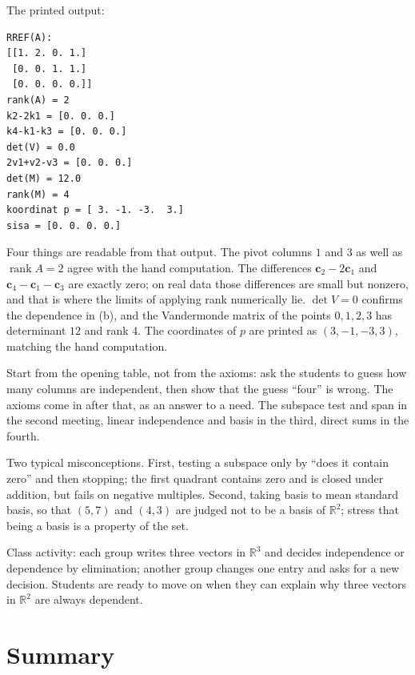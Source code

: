 The printed output:
\begin{verbatim}
RREF(A):
[[1. 2. 0. 1.]
 [0. 0. 1. 1.]
 [0. 0. 0. 0.]]
rank(A) = 2
k2-2k1 = [0. 0. 0.]
k4-k1-k3 = [0. 0. 0.]
det(V) = 0.0
2v1+v2-v3 = [0. 0. 0.]
det(M) = 12.0
rank(M) = 4
koordinat p = [ 3. -1. -3.  3.]
sisa = [0. 0. 0. 0.]
\end{verbatim}

Four things are readable from that output. The pivot columns $1$ and $3$ as well as
$\operatorname{rank}A=2$ agree with the hand computation. The differences
$\mathbf{c}_{2}-2\mathbf{c}_{1}$ and $\mathbf{c}_{4}-\mathbf{c}_{1}-\mathbf{c}_{3}$ are exactly
zero; on real data those differences are small but nonzero, and that is where the limits of
applying rank numerically lie. $\det V=0$ confirms the dependence in (b), and the Vandermonde
matrix of the points $0,1,2,3$ has determinant $12$ and rank $4$. The coordinates of $p$ are
printed as $(3,-1,-3,3)$, matching the hand computation.

\begin{untukdosen}
Start from the opening table, not from the axioms: ask the students to guess how many columns are
independent, then show that the guess ``four'' is wrong. The axioms come in after that, as an
answer to a need. The subspace test and span in the second meeting, linear independence and basis
in the third, direct sums in the fourth.

Two typical misconceptions. First, testing a subspace only by ``does it contain zero'' and then
stopping; the first quadrant contains zero and is closed under addition, but fails on negative
multiples. Second, taking basis to mean standard basis, so that $(5,7)$ and $(4,3)$ are judged not
to be a basis of $\mathbb{R}^{2}$; stress that being a basis is a property of the set.

Class activity: each group writes three vectors in $\mathbb{R}^{3}$ and decides independence or
dependence by elimination; another group changes one entry and asks for a new decision. Students
are ready to move on when they can explain why three vectors in $\mathbb{R}^{2}$ are always
dependent.
\end{untukdosen}

\section{Summary}

